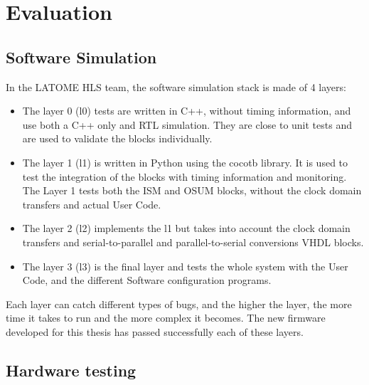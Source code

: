 \chapter{Evaluation}\label{sec:evaluation}

\section{Software Simulation}

In the LATOME HLS team, the software simulation stack is made of 4 layers:
\begin{itemize}
    \item The layer 0 (l0) tests are written in C++, without timing information, and use both a C++ only and RTL simulation. They are close to unit tests and are used to validate the blocks individually.
    \item The layer 1 (l1) is written in Python using the cocotb library. It is used to test the integration of the blocks with timing information and monitoring. The Layer 1 tests both the ISM and OSUM blocks, without the clock domain transfers and actual User Code.
    \item The layer 2 (l2) implements the l1 but takes into account the clock domain transfers and serial-to-parallel and parallel-to-serial conversions VHDL blocks.
    \item The layer 3 (l3) is the final layer and tests the whole system with the User Code, and the different Software configuration programs.
\end{itemize}

Each layer can catch different types of bugs, and the higher the layer, the more time it takes to run and the more complex it becomes. The new firmware developed for this thesis has passed successfully each of these layers.

\section{Hardware testing}
